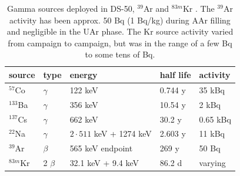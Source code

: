 \begin{table}[htbp]
\centering
\caption{Gamma sources deployed in DS-50, $^{39}$Ar and $^{83m}$Kr \cite{Lippincott:2010jb}. The $^{39}$Ar activity has been approx. 50 Bq (1 Bq/kg) during AAr filling and negligible in the UAr phase. The Kr source activity varied from campaign to campaign, but was in the range of a few Bq to some tens of Bq.} %
\centering
\begin{tabular}{|l|l|l|l|l|}
\hline
\textbf{source} & \textbf{type} & \textbf{energy} & \textbf{half life} & \textbf{activity} \\ \hline
$^{57}$Co & $\gamma$ & 122 keV & 0.744 y  & 35 kBq \\ \hline
$^{133}$Ba & $\gamma$ & 356 keV & 10.54 y & 2 kBq \\ \hline
$^{137}$Cs & $\gamma$ & 662 keV & 30.2 y & 0.65 kBq \\ \hline
$^{22}$Na & $\gamma$ & $2\cdot 511$ keV + 1274 keV & 2.603 y & 11 kBq \\ \hline\hline
$^{39}$Ar & $\beta$ &  565 keV endpoint& 269 y  & 50 Bq\\ \hline
$^{83m}$Kr & 2 $\beta$ &  32.1 keV + 9.4 keV & 86.2 d & varying\\ \hline
\end{tabular}
\label{tbl:GammaSources}
\end{table}



